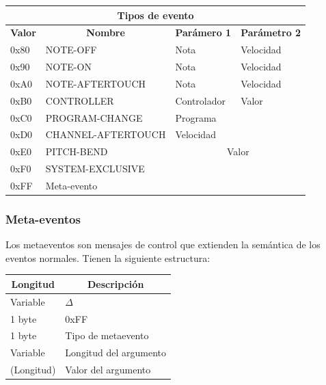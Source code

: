 \smallskip

\begin{center}
	\begin{tabular}{|l|l|l|l|}
		\hline \multicolumn{4}{|c|}{\textbf{Tipos de evento}} \\
		\hline \multicolumn{1}{|c|}{\textbf{Valor}} & \multicolumn{1}{c|}{\textbf{Nombre}} & \multicolumn{1}{c|}{\textbf{Parámero 1}} & \multicolumn{1}{c|}{\textbf{Parámetro 2}} \\
		\hline 0x80 & NOTE-OFF & Nota & Velocidad \\
		\hline 0x90 & NOTE-ON & Nota & Velocidad \\
		\hline 0xA0 & NOTE-AFTERTOUCH & Nota & Velocidad \\
		\hline 0xB0 & CONTROLLER & Controlador & Valor \\
		\hline 0xC0 & PROGRAM-CHANGE & Programa &  \\
		\hline 0xD0 & CHANNEL-AFTERTOUCH & Velocidad &  \\
		\hline 0xE0 & PITCH-BEND & \multicolumn{2}{c|}{Valor} \\
		\hline 0xF0 & SYSTEM-EXCLUSIVE & \multicolumn{2}{c|}{} \\
		\hline 0xFF & Meta-evento & \multicolumn{2}{c|}{} \\
		\hline 
	\end{tabular}
	\smallskip
\end{center}

\smallskip

\subsubsection{Meta-eventos}

Los metaeventos son mensajes de control que extienden la semántica de los eventos normales. Tienen la siguiente estructura:

\smallskip

\begin{center}
	\begin{tabular}{|l|l|}
		\hline \multicolumn{1}{|c|}{\textbf{Longitud}} & \multicolumn{1}{c|}{\textbf{Descripción}} \\
		\hline Variable & $\Delta$ \\ 
		\hline 1 byte & 0xFF \\
		\hline 1 byte & Tipo de metaevento \\
		\hline Variable & Longitud del argumento \\ 
		\hline (Longitud) & Valor del argumento \\ 
		\hline
	\end{tabular}
	\smallskip
\end{center}


